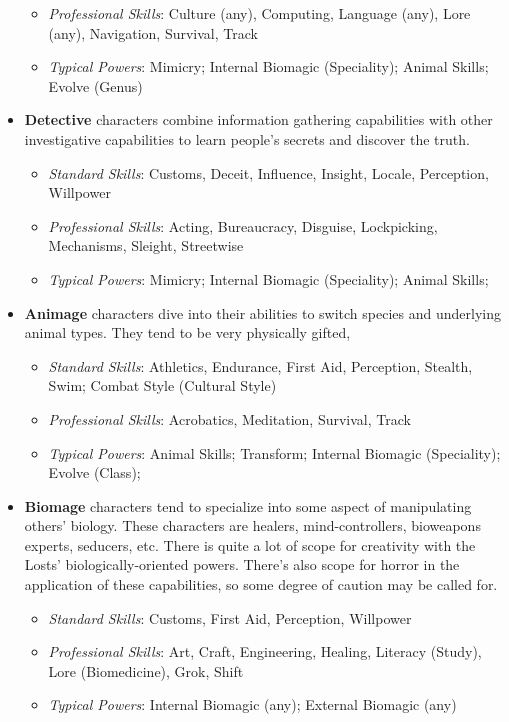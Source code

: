 \documentclass[letterpaper,serif]{rpg-module}
\begin{document}
\begin{itemize}
\begin{itemize}
        \item \emph{Professional Skills}: Culture (any), Computing, Language (any), Lore (any), Navigation, Survival, Track
        \item \emph{Typical Powers}: Mimicry; Internal Biomagic (Speciality); Animal Skills; Evolve (Genus)
    \end{itemize}
    \item \textbf{Detective} characters combine information gathering capabilities with other investigative capabilities to learn people's secrets and discover the truth. 
    \begin{itemize}
        \item \emph{Standard Skills}: Customs, Deceit, Influence, Insight, Locale, Perception, Willpower
        \item \emph{Professional Skills}: Acting, Bureaucracy, Disguise, Lockpicking, Mechanisms, Sleight, Streetwise 
        \item \emph{Typical Powers}: Mimicry; Internal Biomagic (Speciality); Animal Skills; 
    \end{itemize}
    \item \textbf{Animage} characters dive into their abilities to switch species and underlying animal types. They tend to be very physically gifted, 
    \begin{itemize}
        \item \emph{Standard Skills}:  Athletics, Endurance, First Aid, Perception, Stealth, Swim; Combat Style (Cultural Style)
        \item \emph{Professional Skills}: Acrobatics, Meditation, Survival, Track 
        \item \emph{Typical Powers}: Animal Skills; Transform; Internal Biomagic (Speciality); Evolve (Class); 
    \end{itemize}
    \item \textbf{Biomage} characters tend to specialize into some aspect of manipulating others' biology. These characters are healers, mind-controllers, bioweapons experts, seducers, etc. There is quite a lot of scope for creativity with the Losts' biologically-oriented powers. There's also scope for horror in the application of these capabilities, so some degree of caution may be called for.  
    \begin{itemize}
        \item \emph{Standard Skills}: Customs, First Aid, Perception, Willpower
        \item \emph{Professional Skills}: Art, Craft, Engineering, Healing, Literacy (Study), Lore (Biomedicine), Grok, Shift
        \item \emph{Typical Powers}: Internal Biomagic (any); External Biomagic (any) 
    \end{itemize}
    
\end{itemize}
\end{document}
